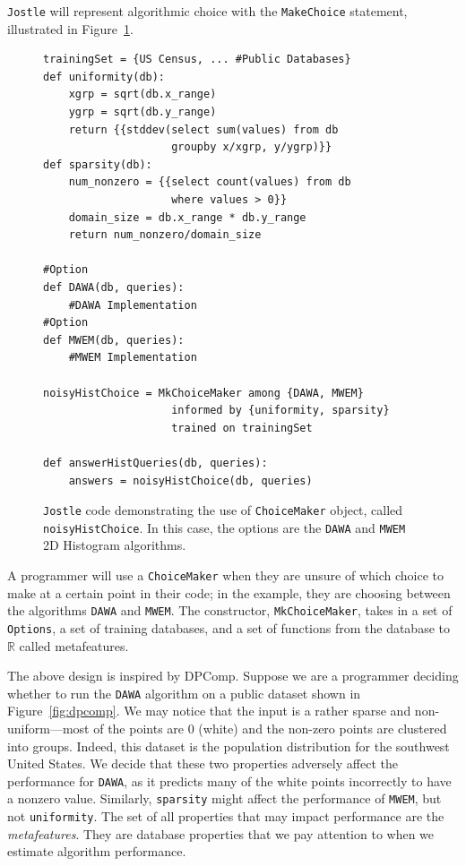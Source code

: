 \documentclass[11pt]{report}
\newcommand{\Jostle}{\texttt{Jostle}}
\renewcommand{\t}[1]{\texttt{#1}}
\begin{document}
\Jostle{} will represent algorithmic choice with the \t{MakeChoice} statement, illustrated in Figure~\ref{fig:1}.
\begin{figure}
\begin{lstlisting}
trainingSet = {US Census, ... #Public Databases}
def uniformity(db):
    xgrp = sqrt(db.x_range)
    ygrp = sqrt(db.y_range)
    return {{stddev(select sum(values) from db 
                    groupby x/xgrp, y/ygrp)}}
def sparsity(db): 
    num_nonzero = {{select count(values) from db 
                    where values > 0}}
    domain_size = db.x_range * db.y_range
    return num_nonzero/domain_size

#Option
def DAWA(db, queries):
    #DAWA Implementation
#Option
def MWEM(db, queries):
    #MWEM Implementation

noisyHistChoice = MkChoiceMaker among {DAWA, MWEM}
                    informed by {uniformity, sparsity}
                    trained on trainingSet

def answerHistQueries(db, queries):
    answers = noisyHistChoice(db, queries)

\end{lstlisting}
\caption{\Jostle{} code demonstrating the use of \t{ChoiceMaker} object, called \t{noisyHistChoice}. In this case, the options are the \t{DAWA} and \t{MWEM} 2D Histogram algorithms.}
\label{fig:1}
\end{figure}
A programmer will use a \t{ChoiceMaker} when they are unsure of which choice to make at a certain point in their code; in the example, they are choosing between the algorithms \t{DAWA} and \t{MWEM}. The constructor, \t{MkChoiceMaker}, takes in a set of \t{Options}, a set of training databases, and a set of functions from the database to $\mathbb{R}$ called metafeatures.

The above design is inspired by DPComp. Suppose we are a programmer deciding whether to run the \t{DAWA} algorithm on a public dataset shown in Figure~\ref{fig:dpcomp}. We may notice that the input is a rather sparse and non-uniform---most of the points are 0 (white) and the non-zero points are clustered into groups. Indeed, this dataset is the population distribution for the southwest United States. We decide that these two properties adversely affect the performance for \t{DAWA}, as it predicts many of the white points incorrectly to have a nonzero value. Similarly, \t{sparsity} might affect the performance of \t{MWEM}, but not \t{uniformity}. The set of all properties that may impact performance are the \emph{metafeatures}. They are database properties that we pay attention to when we estimate algorithm performance.
\end{document}
